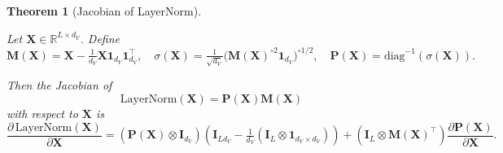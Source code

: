 \documentclass{article}
\newtheorem{theorem}{Theorem} %
\begin{document}
\begin{theorem} [Jacobian of LayerNorm] \label{thm:layernorm_derivative}
    

    Let $\mathbf{X} \in \mathbb{R}^{L \times d_V}$. Define
\[
\mathbf{M}(\mathbf{X}) = \mathbf{X} - \tfrac{1}{d_V}\mathbf{X}\mathbf{1}_{d_V}\mathbf{1}_{d_V}^\top,
\quad
\sigma(\mathbf{X}) = \tfrac{1}{\sqrt{d_V}}\big(\mathbf{M}(\mathbf{X})^{\circ 2}\mathbf{1}_{d_V}\big)^{\circ 1/2},
\quad
\mathbf{P}(\mathbf{X}) = \mathrm{diag}^{-1}(\sigma(\mathbf{X})).
\]

Then the Jacobian of
\[
\text{LayerNorm}(\mathbf{X}) = \mathbf{P}(\mathbf{X}) \mathbf{M}(\mathbf{X})
\]
with respect to $\mathbf{X}$ is
\[
\frac{\partial \,\text{LayerNorm}(\mathbf{X})}{\partial \mathbf{X}}
= (\mathbf{P}(\mathbf{X}) \otimes \mathbf{I}_{d_V})
\left(\mathbf{I}_{Ld_V} - \tfrac{1}{d_V}(\mathbf{I}_L \otimes \mathbf{1}_{d_V \times d_V})\right)
+ (\mathbf{I}_L \otimes \mathbf{M}(\mathbf{X})^\top) \frac{\partial \mathbf{P}(\mathbf{X})}{\partial \mathbf{X}} .
\]
    
\end{theorem}
\end{document}
